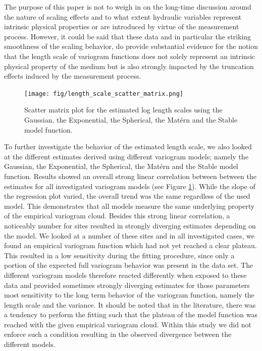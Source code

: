 \documentclass{article}
\begin{document}
The purpose of this paper is not to weigh in on the long-time discussion around the nature of scaling effects and to what extent hydraulic variables represent intrinsic physical properties or are introduced by virtue of the measurement process. However, it could be said that these data and in particular the striking smoothness of the scaling behavior, do provide substantial evidence for the notion that the length scale of variogram functions does not solely represent an intrinsic physical property of the medium but is also strongly impacted by the truncation effects induced by the measurement process.

\begin{figure}[ht]
    \texttt{[image: fig/length\_scale\_scatter\_matrix.png]}
    \caption{Scatter matrix plot for the estimated log length scales using the Gaussian, the Exponential, the Spherical, the Mat{\'e}rn and the Stable model function.}
    \label{fig:scatter_matrix_len_scale}
\end{figure}

To further investigate the behavior of the estimated length scale, we also looked at the different estimates derived using different variogram models; namely the Gaussian, the Exponential, the Spherical, the Mat{\'e}rn and the Stable model function. Results showed an overall strong linear correlation between between the estimates for all investigated variogram models (see Figure \ref{fig:scatter_matrix_len_scale}). While the slope of the regression plot varied, the overall trend was the same regardless of the used model. This demonstrates that all models measure the same underlying property of the empirical variogram cloud. Besides this strong linear correlation, a noticeably number for sites resulted in strongly diverging estimates depending on the model. We looked at a number of these sites and in all investigated cases, we found an empirical variogram function which had not yet reached a clear plateau. This resulted in a low sensitivity during the fitting procedure, since only a portion of the expected full variogram behavior was present in the data set. The different variogram models therefore reacted differently when exposed to these data and provided sometimes strongly diverging estimates for those parameters most sensitivity to the long term behavior of the variogram function, namely the length scale and the variance. It should be noted that in the literature, there was a tendency to perform the fitting such that the plateau of the model function was reached with the given empirical variogram cloud. Within this study we did not enforce such a condition resulting in the observed divergence between the different models.
\end{document}
